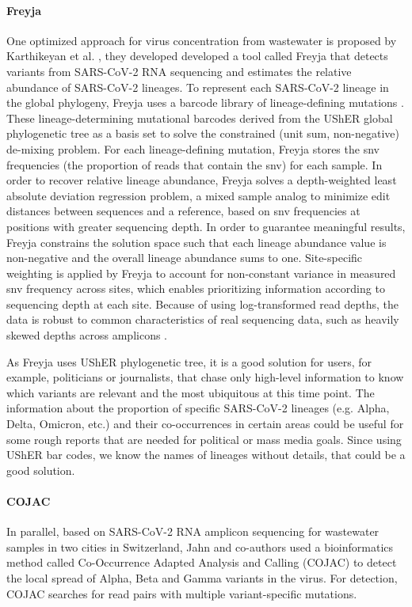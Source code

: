         \paragraph{Freyja}
        One optimized approach for virus concentration from wastewater is proposed by Karthikeyan et al. \cite{karthikeyan2022}, they developed developed a tool called Freyja that detects variants from SARS-CoV-2 RNA sequencing and estimates the relative abundance of SARS-CoV-2 lineages. To represent each SARS-CoV-2 lineage in the global phylogeny, Freyja uses a barcode library of lineage-defining mutations \cite{wastewater2022,mcbroome2021}. These lineage-determining mutational barcodes derived from the UShER \cite{usher} global phylogenetic tree as a basis set to solve the constrained (unit sum, non-negative) de-mixing problem. For each lineage-defining mutation, Freyja stores the \acrfull{snv} frequencies (the proportion of reads that contain the \acrshort{snv}) for each sample. In order to recover relative lineage abundance, Freyja solves a depth-weighted least absolute deviation regression problem, a mixed sample analog to minimize edit distances between sequences and a reference, based on \acrshort{snv} frequencies at positions with greater sequencing depth. In order to guarantee meaningful results, Freyja constrains the solution space such that each lineage abundance value is non-negative and the overall lineage abundance sums to one. Site-specific weighting is applied by Freyja to account for non-constant variance in measured \acrshort{snv} frequency across sites, which enables prioritizing information according to sequencing depth at each site. Because of using log-transformed read depths, the data is robust to common characteristics of real sequencing data, such as heavily skewed depths across amplicons \cite{karthikeyan2022}.

        As Freyja uses UShER phylogenetic tree, it is a good solution for users, for example, politicians or journalists, that chase only high-level information to know which variants are relevant and the most ubiquitous at this time point. The information about the proportion of specific SARS-CoV-2 lineages (e.g. Alpha, Delta, Omicron, etc.) and their co-occurrences in certain areas could be useful for some rough reports that are needed for political or mass media goals. Since using UShER bar codes, we know the names of lineages without details, that could be a good solution. 
        \paragraph{COJAC}
        In parallel, based on SARS-CoV-2 RNA amplicon sequencing for wastewater samples in two cities in Switzerland, Jahn and co-authors used a bioinformatics method called Co-Occurrence Adapted Analysis and Calling (COJAC) \cite{jahn2022} to detect the local spread of Alpha, Beta and Gamma variants in the virus. For detection, COJAC searches for read pairs with multiple variant-specific mutations. 
        
